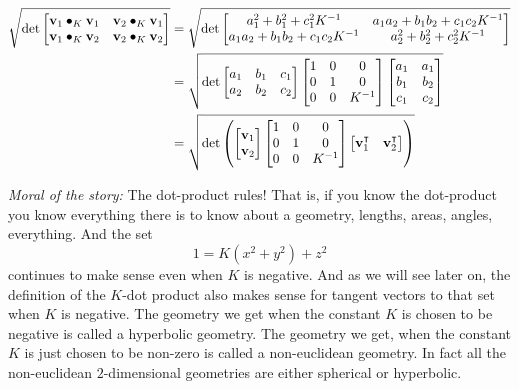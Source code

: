 \documentclass[newpage,hints,handout,12pt,noauthor,nooutcomes]{ximera}
\begin{document}
\begin{problem}
\begin{freeResponse}
\begin{align*}
\sqrt{\det
\begin{bmatrix}
\mathbf{v}_{1}\bullet_{K}\mathbf{v}_{1} & \mathbf{v}_{2}\bullet_{K}\mathbf{v}_{1}\\
\mathbf{v}_{1}\bullet_{K}\mathbf{v}_{2} & \mathbf{v}_{2}\bullet_{K}\mathbf{v}_{2}%
\end{bmatrix}}
&=\sqrt{\det
\begin{bmatrix}
a^2_1 + b^2_1 + c^2_1K^{-1} & a_1a_2 + b_1b_2 + c_1c_2K^{-1}\\
a_1a_2 + b_1b_2 + c_1c_2K^{-1} & a^2_2 + b^2_2 + c^2_2K^{-1}%
\end{bmatrix}} \\
&= \sqrt{\det
\begin{bmatrix}
a_{1} & b_{1} & c_{1}\\
a_{2} & b_{2} & c_{2}
\end{bmatrix}
\begin{bmatrix}
1 & 0 & 0\\
0 & 1 & 0\\
0 & 0 & K^{-1}
\end{bmatrix}
\begin{bmatrix}
a_{1} & a_{1}  \\
b_{1} & b_{2}  \\
c_{1} &  c_{2}
\end{bmatrix}} \\
&= \sqrt{\det\left( 
\begin{bmatrix}
\mathbf{v}_{1} \\
\mathbf{v}_{2}
\end{bmatrix}
\begin{bmatrix}
1 & 0 & 0\\
0 & 1 & 0\\
0 & 0 & K^{-1}%
\end{bmatrix}
\begin{bmatrix}
\mathbf{v}_{1}^\transpose & \mathbf{v}_{2}^\transpose%
\end{bmatrix}
\right) }
\end{align*}
\end{freeResponse}

\end{problem}

\textit{Moral of the story:} The dot-product rules! That is, if you
know the dot-product you know everything there is to know about a
geometry, lengths, areas, angles, everything. And the set
\[
1=K\left(x^{2}+y^{2}\right)+z^{2} 
\]
continues to make sense even when $K$ is
negative. And as we will see later on, the definition of the $K$-dot
product also makes sense for tangent vectors to that set when $K$ is
negative. The geometry we get when the constant $K$ is chosen to be
negative is called a hyperbolic geometry. The geometry we get, when
the constant $K$ is just chosen to be non-zero is called a
non-euclidean geometry.  In fact all the non-euclidean $2$-dimensional
geometries are either spherical or hyperbolic.
\end{document}
